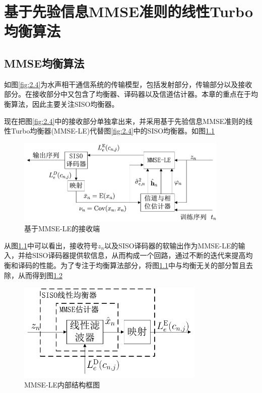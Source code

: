 %
\chapter{基于先验信息MMSE准则的线性Turbo均衡算法}
\thispagestyle{empty}
\section{MMSE均衡算法}
如图\ref{fig:2.4}为水声相干通信系统的传输模型，包括发射部分，传输部分以及接收部分。在接收部分中又包含了均衡器、译码器以及信道估计器。本章的重点在于均衡算法，因此主要关注SISO均衡器。

现在把图\ref{fig:2.4}中的接收部分单独拿出来，并采用基于先验信息MMSE准则的线性Turbo均衡器(MMSE-LE)代替图\ref{fig:2.4}中的SISO均衡器。如图\ref{fig:3.1}

\begin{figure}[htb]
  \begin{center}
    \includegraphics[width=0.9\textwidth]{images/mmse2.pdf}
  \end{center}
  \caption{基于MMSE-LE的接收端}
  \label{fig:3.1}
\end{figure}

从图\ref{fig:3.1}中可以看出，接收符号$z_n$以及SISO译码器的软输出作为MMSE-LE的输入，并给SISO译码器提供软信息，从而构成一个回路，通过不断的迭代来提高均衡和译码的性能。为了专注于均衡算法部分，将图\ref{fig:3.1}中与均衡无关的部分暂且去除，从而得到图\ref{fig:3.2}

\begin{figure}[htb]
  \begin{center}
    \includegraphics[width=0.8\textwidth]{images/mmse_LE.pdf}
  \end{center}
  \caption{MMSE-LE内部结构框图}
  \label{fig:3.2}
\end{figure}

